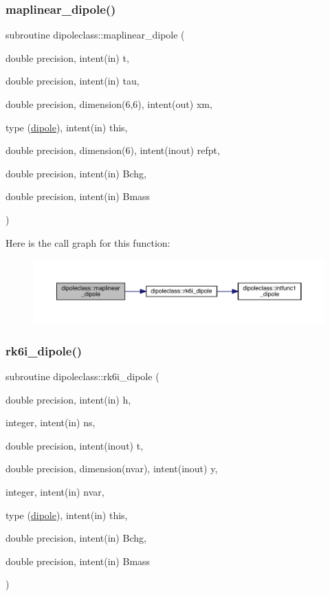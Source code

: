 \subsubsection{\texorpdfstring{maplinear\_dipole()}{maplinear\_dipole()}}
{\footnotesize\ttfamily subroutine dipoleclass\+::maplinear\+\_\+dipole (\begin{DoxyParamCaption}\item[{double precision, intent(in)}]{t,  }\item[{double precision, intent(in)}]{tau,  }\item[{double precision, dimension(6,6), intent(out)}]{xm,  }\item[{type (\mbox{\hyperlink{namespacedipoleclass_structdipoleclass_1_1dipole}{dipole}}), intent(in)}]{this,  }\item[{double precision, dimension(6), intent(inout)}]{refpt,  }\item[{double precision, intent(in)}]{Bchg,  }\item[{double precision, intent(in)}]{Bmass }\end{DoxyParamCaption})}

Here is the call graph for this function\+:\nopagebreak
\begin{figure}[H]
\begin{center}
\leavevmode
\includegraphics[width=350pt]{namespacedipoleclass_a3388afe517788e8b824b96bf49793510_cgraph}
\end{center}
\end{figure}
\mbox{\label{namespacedipoleclass_a1a92cd51d6ad864d251dd3abdc361ba8}} 
\subsubsection{\texorpdfstring{rk6i\_dipole()}{rk6i\_dipole()}}
{\footnotesize\ttfamily subroutine dipoleclass\+::rk6i\+\_\+dipole (\begin{DoxyParamCaption}\item[{double precision, intent(in)}]{h,  }\item[{integer, intent(in)}]{ns,  }\item[{double precision, intent(inout)}]{t,  }\item[{double precision, dimension(nvar), intent(inout)}]{y,  }\item[{integer, intent(in)}]{nvar,  }\item[{type (\mbox{\hyperlink{namespacedipoleclass_structdipoleclass_1_1dipole}{dipole}}), intent(in)}]{this,  }\item[{double precision, intent(in)}]{Bchg,  }\item[{double precision, intent(in)}]{Bmass }\end{DoxyParamCaption})}


